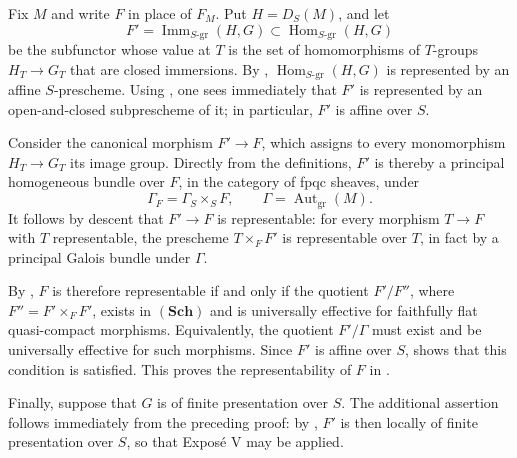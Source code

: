 Fix \(M\) and write \(F\) in place of \(F_M\).  Put
\(H=D_S(M)\), and let
\[
  F'=\operatorname{Imm}_{S\text{-}\mathrm{gr}}(H,G)
  \subset\operatorname{Hom}_{S\text{-}\mathrm{gr}}(H,G)
\]
be the subfunctor whose value at \(T\) is the set of homomorphisms of
\(T\)-groups \(H_T\to G_T\) that are closed immersions.  By
\textit{},
\(\operatorname{Hom}_{S\text{-}\mathrm{gr}}(H,G)\) is represented by
an affine \(S\)-prescheme.  Using , one sees immediately
that \(F'\) is represented by an open-and-closed subprescheme of it;
in particular, \(F'\) is affine over \(S\).

Consider the canonical morphism \(F'\to F\), which assigns to every
monomorphism \(H_T\to G_T\) its image group.  Directly from the
definitions, \(F'\) is thereby a principal homogeneous bundle over
\(F\), in the category of fpqc sheaves, under
\[
  \Gamma_F=\Gamma_S\times_S F,
  \qquad
  \Gamma=\operatorname{Aut}_{\mathrm{gr}}(M).
\]
It follows by descent that \(F'\to F\) is representable: for every
morphism \(T\to F\) with \(T\) representable, the prescheme
\(T\times_F F'\) is representable over \(T\), in fact by a principal
Galois bundle under \(\Gamma\).

By , \(F\) is therefore representable if and only if
the quotient \(F'/F''\), where \(F''=F'\times_F F'\), exists in
\((\mathbf{Sch})\) and is universally effective for faithfully flat
quasi-compact morphisms.  Equivalently, the quotient \(F'/\Gamma\)
must exist and be universally effective for such morphisms.  Since
\(F'\) is affine over \(S\),  shows that this condition
is satisfied.  This proves the representability of \(F\) in
\textit{}.

Finally, suppose that \(G\) is of finite presentation over \(S\).
The additional assertion follows immediately from the preceding
proof: by \textit{}, \(F'\) is then locally of finite presentation
over \(S\), so that Exposé V may be applied.

